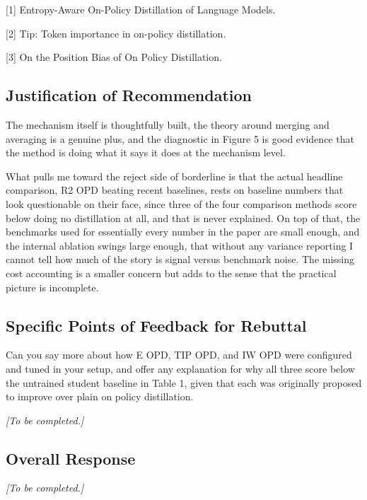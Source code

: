 \documentclass[11pt,a4paper]{article}
\begin{document}
[1] Entropy-Aware On-Policy Distillation of Language Models.

[2] Tip: Token importance in on-policy distillation.

[3] On the Position Bias of On Policy Distillation.

\subsection*{Justification of Recommendation}
The mechanism itself is thoughtfully built, the theory around merging and averaging is a genuine plus, and the diagnostic in Figure 5 is good evidence that the method is doing what it says it does at the mechanism level.

What pulls me toward the reject side of borderline is that the actual headline comparison, R2 OPD beating recent baselines, rests on baseline numbers that look questionable on their face, since three of the four comparison methods score below doing no distillation at all, and that is never explained. On top of that, the benchmarks used for essentially every number in the paper are small enough, and the internal ablation swings large enough, that without any variance reporting I cannot tell how much of the story is signal versus benchmark noise. The missing cost accounting is a smaller concern but adds to the sense that the practical picture is incomplete.

\subsection*{Specific Points of Feedback for Rebuttal}
Can you say more about how E OPD, TIP OPD, and IW OPD were configured and tuned in your setup, and offer any explanation for why all three score below the untrained student baseline in Table 1, given that each was originally proposed to improve over plain on policy distillation.

\par{}
\begin{responsebox}[frametitle={Response to Q1},nobreak=true]
\textit{[To be completed.]}\par\vspace{1em}
\end{responsebox}

\subsection*{Overall Response}
\par{}
\begin{responsebox}[frametitle={Overall Response to Reviewer 5 (YgpD)},nobreak=true]
\textit{[To be completed.]}\par\vspace{1em}
\end{responsebox}
\end{document}
